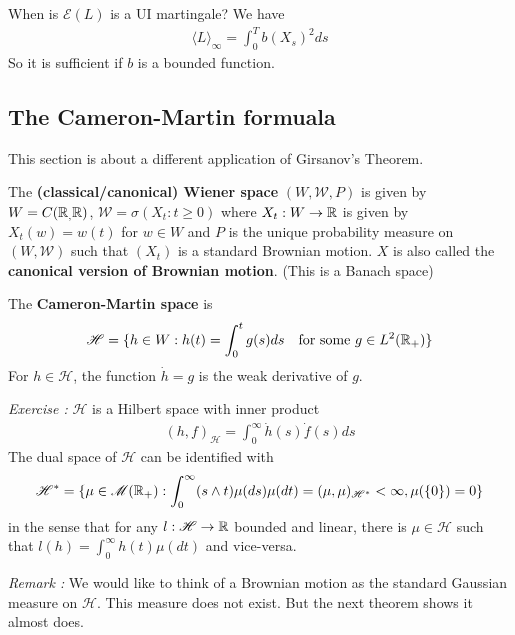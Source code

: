 \documentclass[12pt,a4paper]{article}
\begin{document}
\quad When is $\mathscr{E}(L)$ is a UI martingale? We have
\begin{align*}
\langle L \rangle_{\infty} = \int_0^T b(X_s)^2 ds
\end{align*}
So it is sufficient if $b$ is a bounded function.

\subsection{The Cameron-Martin formuala}

This section is about a different application of Girsanov's Theorem.
\s

 The \textbf{(classical/canonical) Wiener space} $(W,\mathscr{W}, P)$ is given by $W = C(\mathbb{R}_, \mathbb{R})$, $\mathscr{W} = \sigma(X_t : t\geq 0)$ where $X_t : W\rightarrow \mathbb{R}$ is given by $X_t(w) = w(t)$ for $w\in W$ and $P$ is the unique probability measure on $(W, \mathscr{W})$ such that $(X_t)$ is a standard Brownian motion. $X$ is also called the \textbf{canonical version of Brownian motion}. (This is a Banach space)
\s

 The \textbf{Cameron-Martin space} is
\begin{align*}
\mathscr{H} = \{h \in W : h(t) = \int_0^t g(s) ds \quad \text{for some }g\in L^2(\mathbb{R}_+) \}
\end{align*}
For $h\in \mathscr{H}$, the function $\dot{h} =g$ is the weak derivative of $g$.
\s

\emph{Exercise :} $\mathscr{H}$ is a Hilbert space with inner product
\begin{align*}
(h, f)_{\mathscr{H}} = \int_0^{\infty} \dot{h}(s)\dot{f}(s) ds
\end{align*} 
The dual space of $\mathscr{H}$ can be identified with
\begin{align*}
\mathscr{H}^* = \{\mu \in \mathscr{M}(\mathbb{R}_+) : \int_0^{\infty }(s\wedge t)\mu(ds) \mu(dt) = (\mu, \mu)_{\mathscr{H}^*}< \infty, \mu(\{0\})=0\}
\end{align*}
in the sense that for any $l: \mathscr{H} \rightarrow \mathbb{R}$ bounded and linear, there is $\mu \in \mathscr{H}$ such that $l(h) = \int_0^{\infty} h(t) \mu(dt)$ and vice-versa.
\s

\emph{Remark :} We would like to think of a Brownian motion as the standard Gaussian measure on $\mathscr{H}$. This measure does not exist. But the next theorem shows it almost does.
\s
\end{document}
